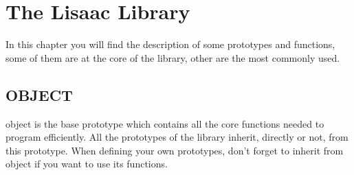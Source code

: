 \documentclass[11pt]{mybook}
\begin{document}
\chapter{The Lisaac{} Library}
\label{library}

In this chapter you will find the description of some prototypes and functions, some of them are at the core of the library, other are the most commonly used.

\section{OBJECT}
\label{library:object}
%
{\sc{}object} is the base prototype which contains all the core functions needed to program efficiently.
All the prototypes of the library inherit, directly or not, from this prototype.
When defining your own prototypes, don't forget to inherit from {\sc{}object} if you want to use its functions.
\end{document}
